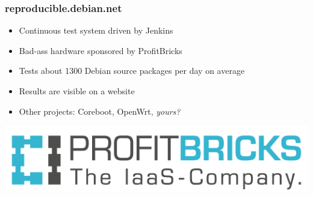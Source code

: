 \documentclass[14pt,aspectratio=169]{beamer}
\begin{document}
\begin{frame}
 \frametitle{reproducible.debian.net}

 \begin{itemize}
  \item Continuous test system driven by Jenkins
  \item Bad-ass hardware sponsored by ProfitBricks
  \item Tests about 1300 Debian source packages per day on average
  \item Results are visible on a website
  \item Other projects: Coreboot, OpenWrt, \textit{yours?}
 \end{itemize}
 \vfill
 \begin{center}
 \includegraphics[height=0.15\paperheight]{images/profitbricks_logo.png}
 \end{center}
\end{frame}
\end{document}
